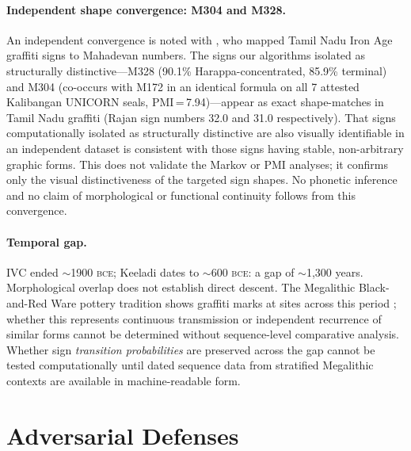 \documentclass[12pt,letterpaper]{article}
\newcommand{\BCE}{\textsc{bce}}
\begin{document}
\paragraph{Independent shape convergence: M304 and M328.}
An independent convergence is noted with \citet{Rajan2025}, who
mapped Tamil Nadu Iron Age graffiti signs to Mahadevan numbers.
The signs our algorithms isolated as structurally distinctive---M328
(90.1\% Harappa-concentrated, 85.9\% terminal) and M304 (co-occurs
with M172 in an identical formula on all 7 attested Kalibangan
UNICORN seals, PMI\,=\,7.94)---appear as exact shape-matches in
Tamil Nadu graffiti (Rajan sign numbers 32.0 and 31.0 respectively).
That signs computationally isolated as structurally distinctive are
also visually identifiable in an independent dataset is consistent
with those signs having stable, non-arbitrary graphic forms.
This does not validate the Markov or PMI analyses; it confirms only
the visual distinctiveness of the targeted sign shapes.
No phonetic inference and no claim of morphological or functional
continuity follows from this convergence.

\paragraph{Temporal gap.}
IVC ended $\sim$1900 \BCE; Keeladi dates to $\sim$600 \BCE: a gap
of $\sim$1,300 years.
Morphological overlap does not establish direct descent.
The Megalithic Black-and-Red Ware pottery tradition shows graffiti
marks at sites across this period \citep[][pp.\ 13--14]{Rajan2025};
whether this represents continuous transmission or independent
recurrence of similar forms cannot be determined without
sequence-level comparative analysis.
Whether sign \emph{transition probabilities} are preserved across the
gap cannot be tested computationally until dated sequence data from
stratified Megalithic contexts are available in machine-readable form.

\section{Adversarial Defenses}
\label{sec:adversarial}
\end{document}
